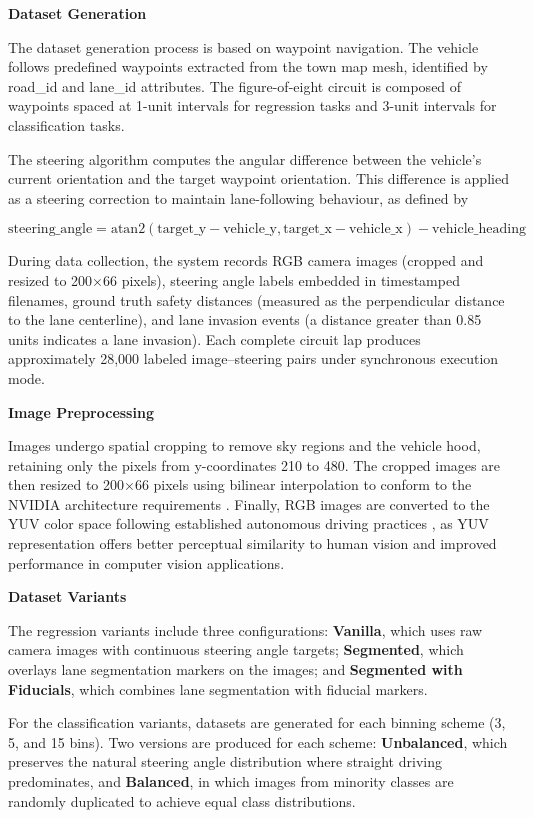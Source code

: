 \textbf{Dataset Generation}

The dataset generation process is based on waypoint navigation. The vehicle follows predefined waypoints extracted from the town map mesh, identified by road\_id and lane\_id attributes. The figure-of-eight circuit is composed of waypoints spaced at 1-unit intervals for regression tasks and 3-unit intervals for classification tasks.

The steering algorithm computes the angular difference between the vehicle’s current orientation and the target waypoint orientation. This difference is applied as a steering correction to maintain lane-following behaviour, as defined by

\[
\mathrm{steering\_angle} = \mathrm{atan2}(\mathrm{target\_y} - \mathrm{vehicle\_y}, \mathrm{target\_x} - \mathrm{vehicle\_x}) - \mathrm{vehicle\_heading}
\]

During data collection, the system records RGB camera images (cropped and resized to 200×66 pixels), steering angle labels embedded in timestamped filenames, ground truth safety distances (measured as the perpendicular distance to the lane centerline), and lane invasion events (a distance greater than 0.85 units indicates a lane invasion). Each complete circuit lap produces approximately 28,000 labeled image–steering pairs under synchronous execution mode.

\textbf{Image Preprocessing}

Images undergo spatial cropping to remove sky regions and the vehicle hood, retaining only the pixels from y-coordinates 210 to 480. The cropped images are then resized to 200×66 pixels using bilinear interpolation to conform to the NVIDIA architecture requirements \cite{bojarski2016end}. Finally, RGB images are converted to the YUV color space following established autonomous driving practices \cite{lecun2004dave}, as YUV representation offers better perceptual similarity to human vision and improved performance in computer vision applications.

\textbf{Dataset Variants}

The regression variants include three configurations: \textbf{Vanilla}, which uses raw camera images with continuous steering angle targets; \textbf{Segmented}, which overlays lane segmentation markers on the images; and \textbf{Segmented with Fiducials}, which combines lane segmentation with fiducial markers.

For the classification variants, datasets are generated for each binning scheme (3, 5, and 15 bins). Two versions are produced for each scheme: \textbf{Unbalanced}, which preserves the natural steering angle distribution where straight driving predominates, and \textbf{Balanced}, in which images from minority classes are randomly duplicated to achieve equal class distributions.



